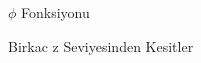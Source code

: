 \documentclass[12pt,fleqn]{article}\usepackage{../common}
\begin{document}
\begin{figure}[!hbp]
\caption{$\phi$ Fonksiyonu}
\end{figure}

\begin{figure}[!hbp]
\caption{Birkac z Seviyesinden Kesitler}
\end{figure}
\end{document}
